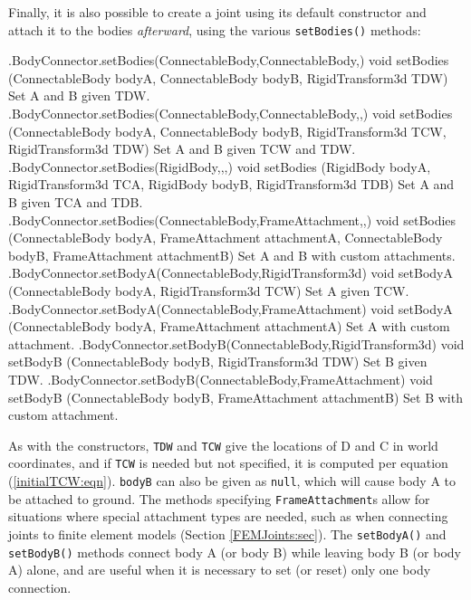 Finally, it is also possible to create a joint using its default constructor
and attach it to the bodies {\it afterward}, using the various {\tt setBodies()}
methods:
%
\begin{methodtable}{0.67}{0.33}
\midline
%
\methodentry
{\mech.BodyConnector.setBodies(ConnectableBody,ConnectableBody,)}%
{void setBodies (ConnectableBody bodyA, ConnectableBody bodyB,\brh
RigidTransform3d TDW)}%
{Set A and B given TDW.}%
%
\methodentry
{\mech.BodyConnector.setBodies(ConnectableBody,ConnectableBody,,)}%
{void setBodies (ConnectableBody bodyA, ConnectableBody bodyB,\brh
RigidTransform3d TCW, RigidTransform3d TDW)}%
{Set A and B given TCW and TDW.}%
%
\methodentry
{\mech.BodyConnector.setBodies(RigidBody,,,)}%
{void setBodies (RigidBody bodyA, RigidTransform3d TCA,\brh
RigidBody bodyB, RigidTransform3d TDB)}%
{Set A and B given TCA and TDB.}%
%
\methodentry
{\mech.BodyConnector.setBodies(ConnectableBody,FrameAttachment,,)}%
{void setBodies (ConnectableBody bodyA, FrameAttachment attachmentA,\brh
ConnectableBody bodyB, FrameAttachment attachmentB)}%
{Set A and B with custom attachments.}%
\methodspace{0.5em}%
\methodentry
{\mech.BodyConnector.setBodyA(ConnectableBody,RigidTransform3d)}%
{void setBodyA (ConnectableBody bodyA, RigidTransform3d TCW)}%
{Set A given TCW.}%
%
\methodentry
{\mech.BodyConnector.setBodyA(ConnectableBody,FrameAttachment)}%
{void setBodyA (ConnectableBody bodyA, FrameAttachment attachmentA)}%
{Set A with custom attachment.}%
%
\methodentry
{\mech.BodyConnector.setBodyB(ConnectableBody,RigidTransform3d)}%
{void setBodyB (ConnectableBody bodyB, RigidTransform3d TDW)}%
{Set B given TDW.}%
%
\methodentry
{\mech.BodyConnector.setBodyB(ConnectableBody,FrameAttachment)}%
{void setBodyB (ConnectableBody bodyB, FrameAttachment attachmentB)}%
{Set B with custom attachment.}%
%
\midline
\end{methodtable}
%
As with the constructors, {\tt TDW} and {\tt TCW} give the locations of D and C
in world coordinates, and if {\tt TCW} is needed but not specified, it is
computed per equation (\ref{initialTCW:eqn}). {\tt bodyB} can also be given as
{\tt null}, which will cause body A to be attached to ground.  The methods
specifying {\tt FrameAttachment}s allow for situations where special attachment
types are needed, such as when connecting joints to finite element models
(Section \ref{FEMJoints:sec}).  The {\tt setBodyA()} and {\tt setBodyB()}
methods connect body A (or body B) while leaving body B (or body A) alone, and
are useful when it is necessary to set (or reset) only one body connection.

